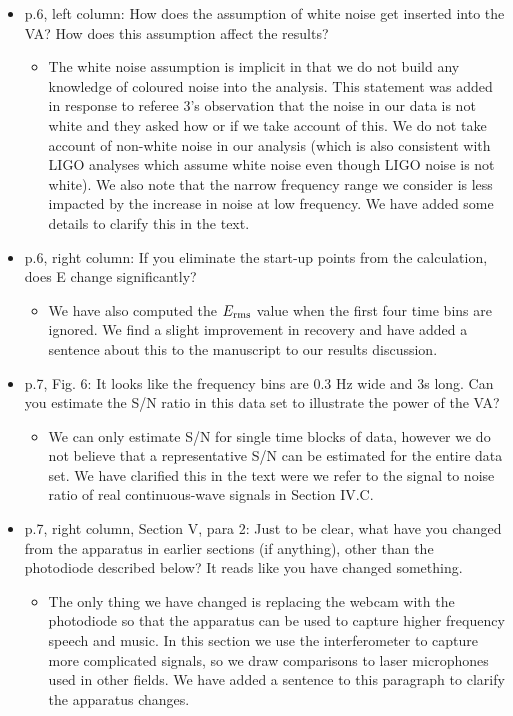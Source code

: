 \documentclass[a4paper, 10pt]{letter}
\begin{document}
\begin{itemize}
\item p.6, left column: How does the assumption of white noise get inserted into the VA? How does this assumption affect the results?
\begin{itemize}
\item The white noise assumption is implicit in that we do not build any knowledge of coloured noise into the analysis. This statement was added in response to referee 3's observation that the noise in our data is not white and they asked how or if we take account of this. We do not take account of non-white noise in our analysis (which is also consistent with LIGO analyses which assume white noise even though LIGO noise is not white). We also note that the narrow frequency range we consider is less impacted by the increase in noise at low frequency. We have added some details to clarify this in the text. 
\end{itemize}

\item p.6, right column: If you eliminate the start-up points from the calculation, does E change significantly?
\begin{itemize}
\item We have also computed the $E_{\rm rms}$ value when the first four time bins are ignored. We find a slight improvement in recovery and have added a sentence about this to the manuscript to our results discussion. 
\end{itemize}

\item p.7, Fig. 6: It looks like the frequency bins are 0.3 Hz wide and 3s long. Can you estimate the S/N ratio in this data set to illustrate the power of the VA?
\begin{itemize}
\item We can only estimate S/N for single time blocks of data, however we do not believe that a representative S/N can be estimated for the entire data set. We have clarified this in the text were we refer to the signal to noise ratio of real continuous-wave signals in Section IV.C.
\end{itemize}

\item p.7, right column, Section V, para 2: Just to be clear, what have you changed from the apparatus in earlier sections (if anything), other than the photodiode described below? It reads like you have changed something.
\begin{itemize}
\item The only thing we have changed is replacing the webcam with the photodiode so that the apparatus can be used to capture higher frequency speech and music. In this section we use the interferometer to capture more complicated signals, so we draw comparisons to laser microphones used in other fields. We have added a sentence to this paragraph to clarify the apparatus changes. 
\end{itemize}


\end{itemize}
\end{document}
